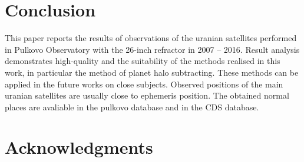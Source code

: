 \documentclass[]{article}
\begin{document}
\begin{figure}[h!]
\begin{minipage}[h]{0.49\linewidth}
\end{minipage}
\begin{minipage}[h]{0.49\linewidth}
\end{minipage}
\end{figure}



\section{Conclusion}
This paper reports the results of observations of the uranian satellites performed in Pulkovo Observatory with the 26-inch refractor in 2007 -- 2016. Result analysis demonstrates high-quality and the suitability of the methods realised in this work, in particular the method of planet halo subtracting. These methods can be applied in the future works on close subjects. Observed positions of the main uranian satellites are usually close to ephemeris position. The obtained normal places are avaliable in the pulkovo database and in the CDS database.

\section{Acknowledgments}
\end{document}
